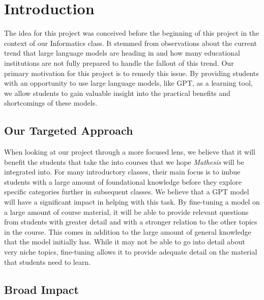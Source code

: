 \documentclass[12pt,a4paper]{article}
\begin{document}
    \pagebreak
    \section{Introduction}

    The idea for this project was conceived before the beginning of this project in the context of
    our Informatics class.  It stemmed from observations about the current trend that large language
    models are heading in and how many educational institutions are not fully prepared to handle the
    fallout of this trend.  Our primary motivation for this project is to remedy this issue.  By
    providing students with an opportunity to use large language models, like GPT, as a learning tool,
    we allow students to gain valuable insight into the practical benefits and shortcomings of these models.

    \subsection{Our Targeted Approach}

    When looking at our project through a more focused lens, we believe that it will benefit the students
    that take the into courses that we hope \textit{Mathesis} will be integrated into.  For many
    introductory classes, their main focus is to imbue students with a large amount of foundational
    knowledge before they explore specific categories further in subsequent classes.  We believe that
    a GPT model will have a significant impact in helping with this task.  By fine-tuning a model
    on a large amount of course material, it will be able to provide relevant questions from students
    with greater detail and with a stronger relation to the other topics in the course.  This comes
    in addition to the large amount of general knowledge that the model initially has.  While it may
    not be able to go into detail about very niche topics, fine-tuning allows it to provide adequate
    detail on the material that students need to learn.

    \subsection{Broad Impact}
\end{document}
